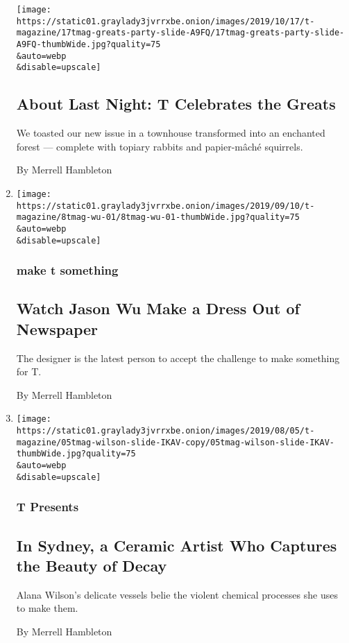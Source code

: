 \begin{enumerate}
  \texttt{[image: https://static01.graylady3jvrrxbe.onion/images/2019/10/17/t-magazine/17tmag-greats-party-slide-A9FQ/17tmag-greats-party-slide-A9FQ-thumbWide.jpg?quality=75\\\&auto=webp\\\&disable=upscale]}

  \hypertarget{about-last-night-t-celebrates-the-greats}{%
  \subsection{About Last Night: T Celebrates the
  Greats}\label{about-last-night-t-celebrates-the-greats}}

  We toasted our new issue in a townhouse transformed into an enchanted
  forest --- complete with topiary rabbits and papier-mâché squirrels.

  By Merrell Hambleton
\item
  \href{/2019/09/08/t-magazine/jason-wu-newspaper-dress.html}{}

  \texttt{[image: https://static01.graylady3jvrrxbe.onion/images/2019/09/10/t-magazine/8tmag-wu-01/8tmag-wu-01-thumbWide.jpg?quality=75\\\&auto=webp\\\&disable=upscale]}

  \hypertarget{make-t-something}{%
  \subsubsection{make t something}\label{make-t-something}}

  \hypertarget{watch-jason-wu-make-a-dress-out-of-newspaper}{%
  \subsection{Watch Jason Wu Make a Dress Out of
  Newspaper}\label{watch-jason-wu-make-a-dress-out-of-newspaper}}

  The designer is the latest person to accept the challenge to make
  something for T.

  By Merrell Hambleton
\item
  \href{/2019/08/07/t-magazine/alana-wilson-ceramics.html}{}

  \texttt{[image: https://static01.graylady3jvrrxbe.onion/images/2019/08/05/t-magazine/05tmag-wilson-slide-IKAV-copy/05tmag-wilson-slide-IKAV-thumbWide.jpg?quality=75\\\&auto=webp\\\&disable=upscale]}

  \hypertarget{t-presents-1}{%
  \subsubsection{T Presents}\label{t-presents-1}}

  \hypertarget{in-sydney-a-ceramic-artist-who-captures-the-beauty-of-decay}{%
  \subsection{In Sydney, a Ceramic Artist Who Captures the Beauty of
  Decay}\label{in-sydney-a-ceramic-artist-who-captures-the-beauty-of-decay}}

  Alana Wilson's delicate vessels belie the violent chemical processes
  she uses to make them.

  By Merrell Hambleton
\end{enumerate}

